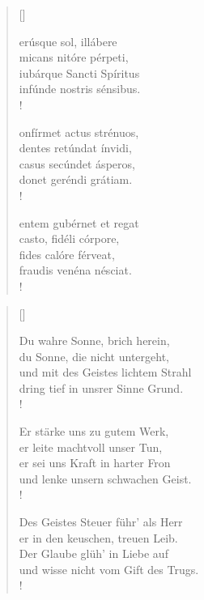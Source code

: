\begin{multicols}{2}
\begin{verse}[\versewidth]

{\small{erúsque sol, illábere\\
micans nitóre pérpeti, \\
iubárque Sancti Spíritus\\
infúnde nostris sénsibus.\\!

onfírmet actus strénuos, \\
dentes retúndat ínvidi,\\
casus secúndet ásperos, \\
donet geréndi grátiam.\\!

entem gubérnet et regat\\
casto, fidéli córpore,\\
fides calóre férveat, \\
fraudis venéna nésciat.\\!}}
\end{verse}

\columnbreak

\begin{verse}[\versewidth]

{\small\rm{ Du wahre Sonne, brich herein,\\
du Sonne, die nicht untergeht,\\
und mit des Geistes lichtem Strahl\\
dring tief in unsrer Sinne Grund.\\!

 Er stärke uns zu gutem Werk,\\
er leite machtvoll unser Tun,\\
er sei uns Kraft in harter Fron\\
und lenke unsern schwachen Geist.\\!

 Des Geistes Steuer führ’ als Herr\\
er in den keuschen, treuen Leib.\\
Der Glaube glüh’ in Liebe auf\\
und wisse nicht vom Gift des Trugs.\\!}}

\end{verse}
\end{multicols}

\newpage

